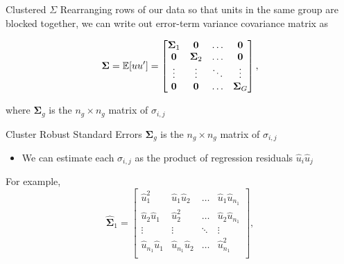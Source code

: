 \documentclass[aspectratio=169,t,11pt,table]{beamer}
\begin{document}
\begin{frame}{Clustered $\Sigma$}
  Rearranging rows of our data so that units in the same group are blocked together, we can write out error-term variance covariance matrix as

  $$
    \bm{\Sigma} = \expec{u u'} = 
    \begin{bmatrix}
      \bm{\Sigma}_{1} & \bm{0}          & \dots  & \bm{0} \\
      \bm{0}          & \bm{\Sigma}_{2} & \dots  & \bm{0} \\
      \vdots          & \vdots          & \ddots & \vdots \\
      \bm{0}          & \bm{0}          & \dots  & \bm{\Sigma}_{G} \\
    \end{bmatrix},
  $$
  
  \medskip
  where $\bm{\Sigma}_{g}$ is the $n_g \times n_g$ matrix of $\sigma_{i,j}$
\end{frame}


\begin{frame}{Cluster Robust Standard Errors}
  $\bm{\Sigma}_{g}$ is the $n_g \times n_g$ matrix of $\sigma_{i,j}$
  \begin{itemize}
    \item We can estimate each $\sigma_{i,j}$ as the product of regression residuals $\hat{u}_i \hat{u}_j$
  \end{itemize}

  \bigskip
  For example,
  $$
    \hat{\bm{\Sigma}}_1 = \begin{bmatrix}
      \hat{u}_1^2 & \hat{u}_1 \hat{u}_2 & \dots  & \hat{u}_1 \hat{u}_{n_1} \\
      \hat{u}_2 \hat{u}_1 & \hat{u}_2^2 & \dots  & \hat{u}_2 \hat{u}_{n_1} \\
      \vdots          & \vdots          & \ddots & \vdots \\
      \hat{u}_{n_1} \hat{u}_1 & \hat{u}_{n_1} \hat{u}_2 & \dots & \hat{u}_{n_1}^2 \\
    \end{bmatrix},
  $$
\end{frame}
\end{document}
